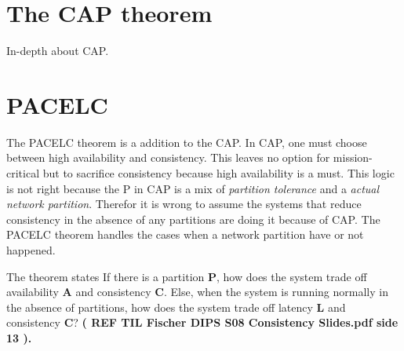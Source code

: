 \section{The CAP theorem}

In-depth about CAP.

\section{PACELC}
The PACELC theorem is a addition to the CAP. In CAP, one must choose between high availability and consistency. This leaves no option for mission-critical but to sacrifice consistency because high availability is a must. This logic is not right because the P in CAP is a mix of \textit{partition tolerance} and a \textit{actual network partition}. Therefor it is wrong to assume the systems that reduce consistency in the absence of any partitions are doing it because of CAP. The PACELC theorem handles the cases when a network partition have or not happened.

The theorem states If there is a partition \textbf{P}, how does the system trade off availability \textbf{A} and consistency \textbf{C}. Else, when the system is running normally in
the absence of partitions, how does the system trade off latency \textbf{L}
and consistency \textbf{C}? \textbf{( REF TIL Fischer DIPS S08 Consistency Slides.pdf side 13 ).}

